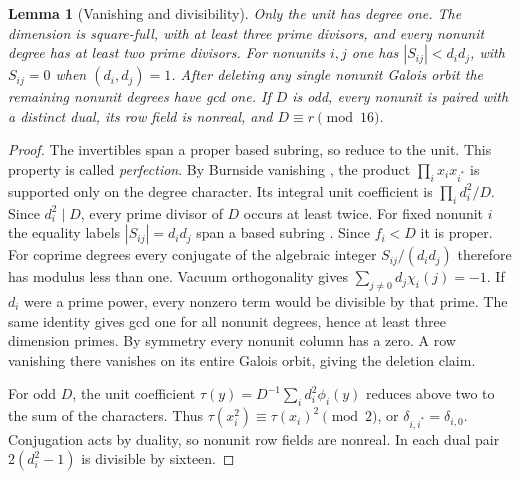 \documentclass[11pt]{amsart}
\numberwithin{equation}{section}
\newtheorem{lemma}[theorem]{Lemma}
\theoremstyle{definition}
\theoremstyle{plain}
\begin{document}
\begin{lemma}[Vanishing and divisibility]\label{alg:odd-parity}
Only the unit has degree one. The dimension is square-full, with
at least three prime divisors, and every nonunit degree has at least
two prime divisors. For nonunits $i,j$ one has $|S_{ij}|<d_id_j$,
with $S_{ij}=0$ when $(d_i,d_j)=1$. After deleting any single nonunit
Galois orbit the remaining nonunit degrees have gcd one.
If $D$ is odd, every nonunit is paired with a distinct dual, its row
field is nonreal, and $D\equiv r\pmod{16}$.
\end{lemma}
\begin{proof}
The invertibles span a proper based subring, so reduce to the unit.
This property is called \emph{perfection}. By Burnside vanishing \cite[Theorem~1.2]{BPBurnside}, the product
$\prod_i x_i x_{i^*}$ is supported only on the degree character.
Its integral unit coefficient is $\prod_i d_i^2/D$. Since $d_i^2\mid D$,
every prime divisor of $D$ occurs at least twice. For fixed nonunit $i$ the equality
labels $|S_{ij}|=d_id_j$ span a based subring
\cite[Lemma~2.35]{BPBurnside}. Since $f_i<D$ it is proper.
For coprime degrees every conjugate of the algebraic integer
$S_{ij}/(d_id_j)$ therefore has modulus less than one. Vacuum
orthogonality gives $\sum_{j\ne0}d_j\chi_i(j)=-1$. If $d_i$ were a
prime power, every nonzero term would be divisible by that prime.
The same identity gives gcd one for all nonunit degrees, hence at
least three dimension primes. By symmetry every nonunit column has a zero. A row vanishing
there vanishes on its entire Galois orbit, giving the deletion claim.

For odd $D$, the unit coefficient
$\tau(y)=D^{-1}\sum_i d_i^2\phi_i(y)$ reduces above two to the sum
of the characters. Thus $\tau(x_i^2)\equiv\tau(x_i)^2\pmod2$,
or $\delta_{i,i^*}=\delta_{i,0}$. Conjugation acts by duality, so
nonunit row fields are nonreal. In each dual pair $2(d_i^2-1)$ is
divisible by sixteen.
\end{proof}
\end{document}
